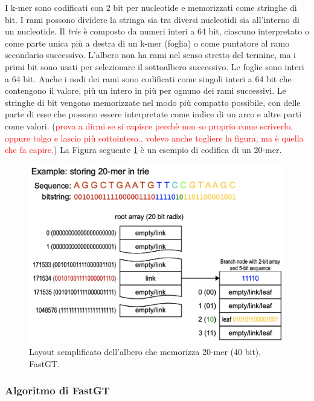 \documentclass[../main.tex]{subfiles}
\begin{document}
I k-mer sono codificati con 2 bit per nucleotide e memorizzati come stringhe di bit. I rami possono dividere la stringa sia tra diversi nucleotidi sia all'interno di un nucleotide. Il \textit{trie} è composto da numeri interi a 64 bit, ciascuno interpretato o come parte unica più a destra di un k-mer (foglia) o come puntatore al ramo secondario successivo. L'albero non ha rami nel senso stretto del termine, ma i primi bit sono usati per selezionare il sottoalbero successivo. Le foglie sono interi a 64 bit. Anche i nodi dei rami sono codificati come singoli interi a 64 bit che contengono il valore, più un intero in più per ognuno dei rami successivi. Le stringhe di bit vengono memorizzate nel modo più compatto possibile, con delle parte di esse che possono essere interpretate come indice di un arco e altre parti come valori. (\textcolor{red}{prova a dirmi se si capisce perchè non so proprio come scriverlo, oppure tolgo e lascio più sottointeso.. volevo anche togliere la figura, ma è quella che fa capire.})
La Figura seguente \ref{fig:art} è un esempio di codifica di un 20-mer.

\begin{figure}[h!]
	\centering
  	\captionsetup{justification=centering}
  	\includegraphics[scale=.35]{images/fastgt-art.png}
  	\caption{Layout semplificato dell'albero che memorizza 20-mer (40 bit), FastGT.}
  	\label{fig:art}
\end{figure}


\subsubsection{Algoritmo di FastGT}
\end{document}
